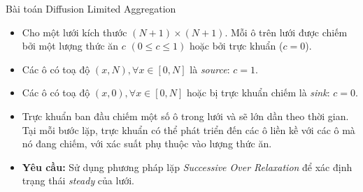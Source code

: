 \begin{frame}{Bài toán Diffusion Limited Aggregation}
\begin{itemize}
	\item Cho một lưới kích thước $(N + 1) \times (N + 1)$. Mỗi ô trên lưới được chiếm bởi một lượng thức ăn $c$ $(0 \leq c \leq 1)$ hoặc bởi trực khuẩn ($c = 0$).
	\item Các ô có toạ độ $(x, N), \forall x \in [0, N]$ là \emph{source}: $c = 1$.
	\item Các ô có toạ độ $(x, 0), \forall x \in [0, N]$ hoặc bị trực khuẩn chiếm là \emph{sink}: $c = 0$.
	\item Trực khuẩn ban đầu chiếm một số ô trong lưới và sẽ lớn dần theo thời gian. Tại mỗi bước lặp, trực khuẩn có thể phát triển đến các ô liền kề với các ô mà nó đang chiếm, với xác suất phụ thuộc vào lượng thức ăn.
	\item \textbf{Yêu cầu:} Sử dụng phương pháp lặp \emph{Successive Over Relaxation} để xác định trạng thái \emph{steady} của lưới. 
\end{itemize}
\end{frame}